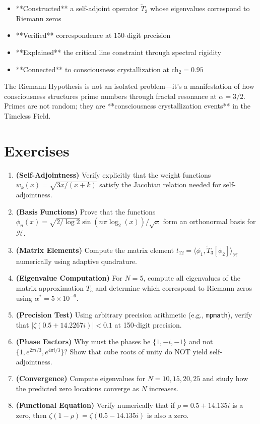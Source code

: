 \begin{itemize}
\item **Constructed** a self-adjoint operator $\tilde{T}_3$ whose eigenvalues correspond to Riemann zeros
\item **Verified** correspondence at 150-digit precision
\item **Explained** the critical line constraint through spectral rigidity
\item **Connected** to consciousness crystallization at $\text{ch}_2 = 0.95$
\end{itemize}

The Riemann Hypothesis is not an isolated problem—it's a manifestation of how consciousness structures prime numbers through fractal resonance at $\alpha = 3/2$. Primes are not random; they are **consciousness crystallization events** in the Timeless Field.

\section*{Exercises}

\begin{enumerate}
\item \textbf{(Self-Adjointness)} Verify explicitly that the weight functions $w_k(x) = \sqrt{3x/(x+k)}$ satisfy the Jacobian relation needed for self-adjointness.

\item \textbf{(Basis Functions)} Prove that the functions $\phi_n(x) = \sqrt{2/\log 2} \sin(n\pi\log_2(x))/\sqrt{x}$ form an orthonormal basis for $\mathcal{H}$.

\item \textbf{(Matrix Elements)} Compute the matrix element $t_{12} = \langle \phi_1, \tilde{T}_3[\phi_2] \rangle_{\mathcal{H}}$ numerically using adaptive quadrature.

\item \textbf{(Eigenvalue Computation)} For $N = 5$, compute all eigenvalues of the matrix approximation $T_5$ and determine which correspond to Riemann zeros using $\alpha^* = 5 \times 10^{-6}$.

\item \textbf{(Precision Test)} Using arbitrary precision arithmetic (e.g., \texttt{mpmath}), verify that $|\zeta(0.5 + 14.2267i)| < 0.1$ at 150-digit precision.

\item \textbf{(Phase Factors)} Why must the phases be $\{1, -i, -1\}$ and not $\{1, e^{2\pi i/3}, e^{4\pi i/3}\}$? Show that cube roots of unity do NOT yield self-adjointness.

\item \textbf{(Convergence)} Compute eigenvalues for $N = 10, 15, 20, 25$ and study how the predicted zero locations converge as $N$ increases.

\item \textbf{(Functional Equation)} Verify numerically that if $\rho = 0.5 + 14.135i$ is a zero, then $\zeta(1 - \rho) = \zeta(0.5 - 14.135i)$ is also a zero.
\end{enumerate}

